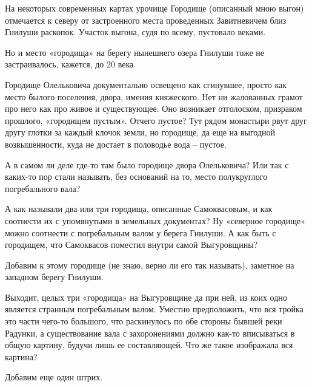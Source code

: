 На некоторых современных картах урочище Городище (описанный мною выгон) отмечается к северу от застроенного места проведенных Завитневичем близ Гнилуши раскопок. Участок выгона, судя по всему, пустовало веками.

Но и место «городища» на берегу нынешнего озера Гнилуши тоже не застраивалось, кажется, до 20 века.

Городище Олельковича документально освещено как сгинувшее, просто как место былого поселения, двора, имения княжеского. Нет ни жалованных грамот про него как про живое и существующее. Оно возникает отголоском, призраком прошлого, «городищем пустым». Отчего пустое? Тут рядом монастыри рвут друг другу глотки за каждый клочок земли, но городище, да еще на выгодной возвышенности, куда не достает в половодье вода – пустое.

А в самом ли деле где-то там было городище двора Олельковича? Или так с каких-то пор стали называть, без оснований на то, место полукруглого погребального вала?

А как называли два или три городища, описанные Самоквасовым, и как соотнести их с упомянутыми в земельных документах? Ну «северное городище» можно соотнести с погребальным валом у берега Гнилуши. А как быть с городищем, что Самоквасов поместил внутри самой Выгуровщины?

Добавим к этому городище (не знаю, верно ли его так называть), заметное на западном берегу Гнилуши.

Выходит, целых три «городища» на Выгуровщине да при ней, из коих одно является странным погребальным валом. Уместно предположить, что вся тройка это части чего-то большого, что  раскинулось по обе стороны бывшей реки Радунки, а существование вала с захоронениями должно как-то вписываться в общую картину, будучи лишь ее составляющей. Что же такое изображала вся картина?

Добавим еще один штрих.
